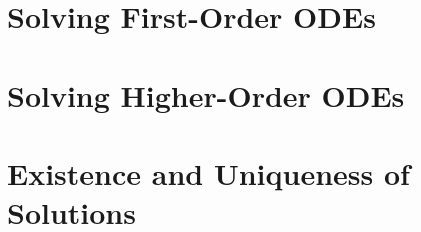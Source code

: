 \documentclass{report}
\begin{document}
	
	\thispagestyle{empty}
	\newpage%
	\tableofcontents
  
  \chapter{Solving First-Order ODEs}
  
  \chapter{Solving Higher-Order ODEs}
  
  \chapter{Existence and Uniqueness of Solutions}
  
  
\end{document}
